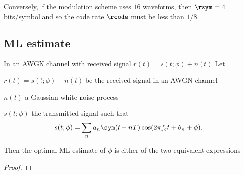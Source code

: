 {\begin{example}
\begin{enumerate}
  Conversely, if the modulation scheme uses $16$ waveforms, then
  $\rsym=4$ bits/symbol and so the code rate $\rcode$ must be
  less than $1/8$.
\end{enumerate}
\end{example}



\subsection{ML estimate}
\begin{theorem}
\label{thm:estML_QAM}
In an AWGN channel with received signal $r(t)=s(t;\phi)+n(t)$
Let
\begin{liste}
   \item $r(t)=s(t;\phi)+n(t)$ be the received signal in an AWGN channel
   \item $n(t)$ a Gaussian white noise process
   \item $s(t;\phi)$ the transmitted signal such that
       \[s(t;\phi) = \sum_n a_n \sym(t-nT)\cos(2\pi f_ct+\theta_n+\phi).\]
\end{liste}

Then the optimal ML estimate of $\phi$ is either of the two equivalent
expressions
\end{theorem}
\begin{proof}


\end{proof}}
